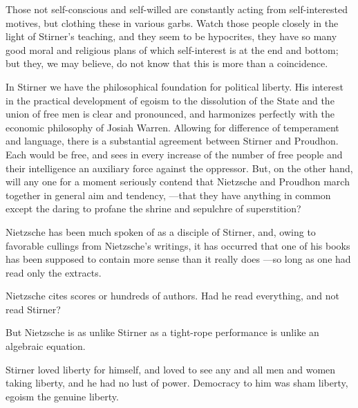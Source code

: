 Those not self-conscious and self-willed are constantly acting from 
self-interested motives, but clothing these in various garbs. Watch those 
people closely in the light of Stirner's teaching, and they seem to be 
hypocrites, they have so many good moral and religious plans of which 
self-interest is at the end and bottom; but they, we may believe, do not know 
that this is more than a coincidence.

In Stirner we have the philosophical foundation for political liberty. His 
interest in the practical development of egoism to the dissolution of the 
State and the union of free men is clear and pronounced, and harmonizes 
perfectly with the economic philosophy of Josiah Warren. Allowing for 
difference of temperament and language, there is a substantial agreement 
between Stirner and Proudhon. Each would be free, and sees in every increase 
of the number of free people and their intelligence an auxiliary force against 
the oppressor. But, on the other hand, will any one for a moment seriously 
contend that Nietzsche and Proudhon march together in general aim and 
tendency, ---that they have anything in common except the daring to profane 
the shrine and sepulchre of superstition?

Nietzsche has been much spoken of as a disciple of Stirner, and, owing to 
favorable cullings from Nietzsche's writings, it has occurred that one of his 
books has been supposed to contain more sense than it really does ---so long 
as one had read only the extracts.

Nietzsche cites scores or hundreds of authors. Had he read everything, and not 
read Stirner?

But Nietzsche is as unlike Stirner as a tight-rope performance is unlike an 
algebraic equation.

Stirner loved liberty for himself, and loved to see any and all men and women 
taking liberty, and he had no lust of power. Democracy to him was sham 
liberty, egoism the genuine liberty.

